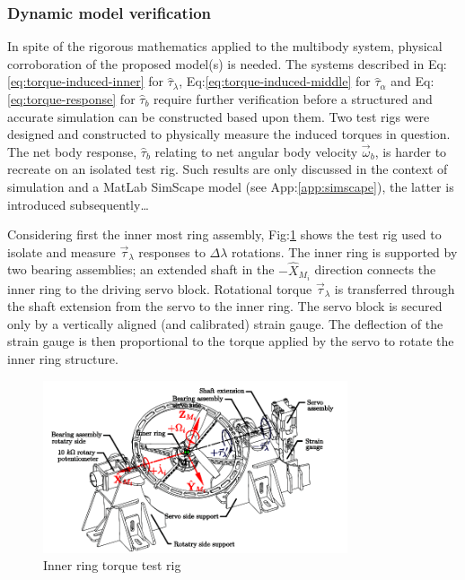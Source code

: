 \subsubsection{Dynamic model verification}
In spite of the rigorous mathematics applied to the multibody system, physical corroboration of the proposed model(s) is needed. The systems described in Eq:\ref{eq:torque-induced-inner} for $\hat{\tau}_\lambda$, Eq:\ref{eq:torque-induced-middle} for $\hat{\tau}_\alpha$ and Eq:\ref{eq:torque-response} for $\hat{\tau}_b$ require further verification before a structured and accurate simulation can be constructed based upon them. Two test rigs were designed and constructed to physically measure the induced torques in question. The net body response, $\hat{\tau}_b$ relating to net angular body velocity $\vec{\omega}_b$, is harder to recreate on an isolated test rig. Such results are only discussed in the context of simulation and a MatLab SimScape model (see App:\ref{app:simscape}), the latter is introduced subsequently\ldots
\par
Considering first the inner most ring assembly, Fig:\ref{fig:torque-inner} shows the test rig used to isolate and measure $\vec{\tau}_\lambda$ responses to $\Delta\lambda$ rotations. The inner ring is supported by two bearing assemblies; an extended shaft in the $-\hat{X}_{M_i}$ direction connects the inner ring to the driving servo block. Rotational torque $\vec{\tau}_\lambda$ is transferred through the shaft extension from the servo to the inner ring. The servo block is secured only by a vertically aligned (and calibrated) strain gauge. The deflection of the strain gauge is then proportional to the torque applied by the servo to rotate the inner ring structure.
\newpage
\begin{figure}[htpb]
\centering
\includegraphics[width=0.8\textwidth]{figs/torque-inner}
\caption{Inner ring torque test rig}
\label{fig:torque-inner}
\vspace{-12pt}
\end{figure}
